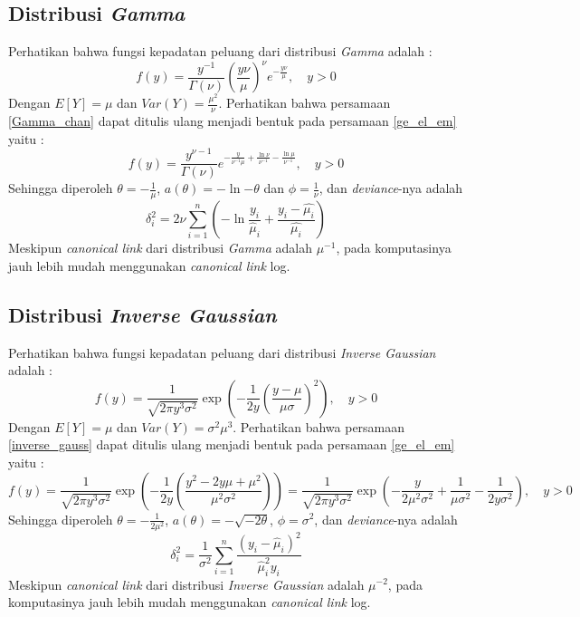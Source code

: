 \documentclass[12pt]{article}
\begin{document}
\subsection{Distribusi \textit{Gamma}}
Perhatikan bahwa fungsi kepadatan peluang dari distribusi \textit{Gamma} adalah : 
\begin{equation}
    \label{Gamma_chan}
    f(y) = \frac{y^{-1}}{\Gamma(\nu)}\left(\frac{y\nu}{\mu}\right)^\nu e^{-\frac{y\nu}{\mu}}, \quad y>0
\end{equation}
Dengan $E[Y] = \mu$ dan $Var(Y) = \frac{\mu^2}{\nu}$. Perhatikan bahwa persamaan \ref{Gamma_chan} dapat ditulis ulang menjadi bentuk pada persamaan \ref{ge_el_em} yaitu : 
\begin{equation}
     f(y) = \frac{y^{\nu-1}}{\Gamma(\nu)} e^{-\frac{y}{\nu^{-1}\mu} + \frac{\ln{\nu}}{\nu^{-1}} -\frac{\ln{\mu}}{\nu^{-1}}}, \quad y>0
\end{equation}
Sehingga diperoleh $\theta = -\frac{1}{\mu}$, $a(\theta) = -\ln{-\theta}$ dan $\phi =\frac{1}{\nu} $, dan \textit{deviance}-nya adalah
\begin{equation}
    \label{deviance_gamma}
    \delta_i^2 = 2\nu\sum_{i=1}^n\left(-\ln{\frac{y_i}{\hat{\mu}_i}}+\frac{y_i-\hat{\mu_i}}{\hat{\mu_i}}\right)
\end{equation}
Meskipun \textit{canonical link} dari distribusi \textit{Gamma} adalah $\mu^{-1}$, pada komputasinya jauh lebih mudah menggunakan \textit{canonical link} log.
\subsection{Distribusi \textit{Inverse Gaussian}}
Perhatikan bahwa fungsi kepadatan peluang dari distribusi \textit{Inverse Gaussian} adalah : 
\begin{equation}
    \label{inverse_gauss}
    f(y) = \frac{1}{\sqrt{2\pi y^3\sigma^2}}\exp\left(-\frac{1}{2y} \left(\frac{y-\mu}{\mu\sigma}\right)^2 \right), \quad y>0
\end{equation}
Dengan $E[Y] = \mu$ dan $Var(Y) = \sigma^2 \mu^3$. Perhatikan bahwa persamaan \ref{inverse_gauss} dapat ditulis ulang menjadi bentuk pada persamaan \ref{ge_el_em} yaitu :
\begin{equation}
    \label{inverse_gauss2}
    f(y) = \frac{1}{\sqrt{2\pi y^3\sigma^2}}\exp{\left(-\frac{1}{2y} \left(\frac{y^2-2y\mu+\mu^2}{\mu^2\sigma^2}\right) \right)}=\frac{1}{\sqrt{2\pi y^3\sigma^2}}\exp{\left(-\frac{y}{2\mu^2\sigma^2}+\frac{1}{\mu\sigma^2}-\frac{1}{2y\sigma^2}\right)}, \quad y>0
\end{equation}
Sehingga diperoleh $\theta = -\frac{1}{2\mu^2}$, $a(\theta) = -\sqrt{-2\theta}$, $\phi =\sigma^2$, dan \textit{deviance}-nya adalah
\begin{equation}
    \label{deviance_inv}
    \delta_i^2 = \frac{1}{\sigma^2}\sum_{i=1}^n \frac{(y_i-\hat{\mu}_i)^2}{\hat{\mu}_i^2y_i}
\end{equation}  
Meskipun \textit{canonical link} dari distribusi \textit{Inverse Gaussian} adalah $\mu^{-2}$, pada komputasinya jauh lebih mudah menggunakan \textit{canonical link} log. 
\newpage 
\end{document}
